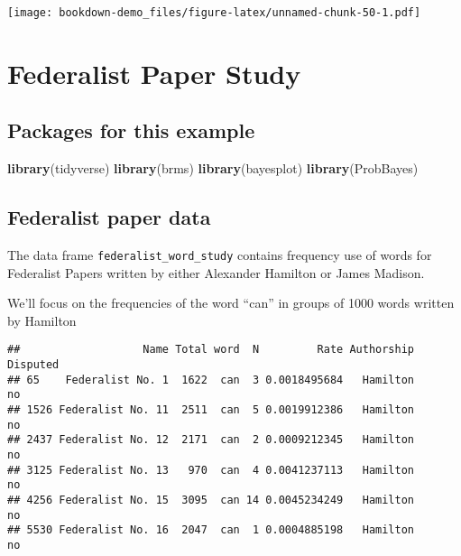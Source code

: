 \documentclass[
]{book}
\newenvironment{Shaded}{\begin{snugshade}}{\end{snugshade}}
\newcommand{\KeywordTok}[1]{\textcolor[rgb]{0.13,0.29,0.53}{\textbf{#1}}}
\newcommand{\NormalTok}[1]{#1}
\newcommand{\OperatorTok}[1]{\textcolor[rgb]{0.81,0.36,0.00}{\textbf{#1}}}
\newcommand{\StringTok}[1]{\textcolor[rgb]{0.31,0.60,0.02}{#1}}
\begin{document}
\texttt{[image: bookdown-demo\_files/figure-latex/unnamed-chunk-50-1.pdf]}

\hypertarget{federalist-paper-study}{%
\chapter{Federalist Paper Study}\label{federalist-paper-study}}

\hypertarget{packages-for-this-example}{%
\section{Packages for this example}\label{packages-for-this-example}}

\begin{Shaded}
\begin{Highlighting}[]
\KeywordTok{library}\NormalTok{(tidyverse)}
\KeywordTok{library}\NormalTok{(brms)}
\KeywordTok{library}\NormalTok{(bayesplot)}
\KeywordTok{library}\NormalTok{(ProbBayes)}
\end{Highlighting}
\end{Shaded}

\hypertarget{federalist-paper-data}{%
\section{Federalist paper data}\label{federalist-paper-data}}

The data frame \texttt{federalist\_word\_study} contains frequency use of words for Federalist Papers written by either Alexander Hamilton or James Madison.

We'll focus on the frequencies of the word ``can'' in groups of 1000 words written by Hamilton

\begin{Shaded}
\end{Shaded}

\begin{verbatim}
##                   Name Total word  N         Rate Authorship Disputed
## 65    Federalist No. 1  1622  can  3 0.0018495684   Hamilton       no
## 1526 Federalist No. 11  2511  can  5 0.0019912386   Hamilton       no
## 2437 Federalist No. 12  2171  can  2 0.0009212345   Hamilton       no
## 3125 Federalist No. 13   970  can  4 0.0041237113   Hamilton       no
## 4256 Federalist No. 15  3095  can 14 0.0045234249   Hamilton       no
## 5530 Federalist No. 16  2047  can  1 0.0004885198   Hamilton       no
\end{verbatim}
\end{document}
